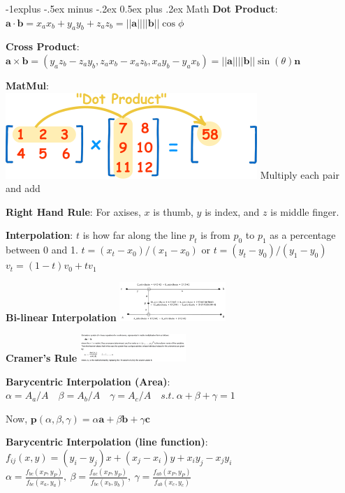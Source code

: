 \documentclass[letterpaper, 8pt]{extarticle}
\makeatletter
\renewcommand{\section}{\@startsection{section}{1}{0mm}%
                                {-1explus -.5ex minus -.2ex}%
                                {0.5ex plus .2ex}%
                                {\normalfont\small\bfseries}}
\makeatother
\begin{document}
\begin{multicols*}{4}

\section{Math}
\textbf{Dot Product}:
\(
\mathbf{a} \cdot \mathbf{b}
= x_a x_b + y_a y_b + z_a z_b
= ||\mathbf{a}|| ||\mathbf{b}|| \cos \phi
\)

\textbf{Cross Product}:
\(
\mathbf{a} \times \mathbf{b}
= (y_a z_b - z_a y_b, z_a x_b - x_a z_b, x_a y_b - y_a x_b)
= ||\mathbf{a}|| ||\mathbf{b}|| \sin(\theta) \mathbf{n}
\)

\textbf{MatMul}:\\
\includegraphics[width=0.3\linewidth]{matrix-multiply-a.png}
Multiply each pair and add

\textbf{Right Hand Rule}:
For axises, $x$ is thumb, $y$ is index, and $z$ is middle finger.

\textbf{Interpolation}:
\(t\) is how far along the line \(p_t\) is from \(p_0\) to \(p_1\) as a percentage between 0 and 1.
\(
t = (x_t - x_0) / (x_1 - x_0)
\text{ or }
t = (y_t - y_0) / (y_1 - y_0)
\)
\(
v_t = (1-t) v_0 + t v_1
\)

\textbf{Bi-linear Interpolation}
\includegraphics[width=4cm]{bilinear-interpolation.png}

\textbf{Cramer's Rule}
\includegraphics[width=4cm]{cramer.png}

\textbf{Barycentric Interpolation (Area)}:
\(
\alpha = A_a / A \quad
\beta = A_b / A \quad
\gamma = A_c / A \quad
s.t.\ \alpha + \beta + \gamma = 1
\)

Now,
\(
\mathbf{p}(\alpha, \beta, \gamma)
= \alpha \mathbf{a} + \beta \mathbf{b} + \gamma \mathbf{c}
\)

\textbf{Barycentric Interpolation (line function)}:
$f_{ij}(x, y) = (y_i - y_j) x + (x_j - x_i)y + x_i y_j - x_j y_i$ \\
$\alpha = \frac{f_{bc}(x_P, y_P)}{f_{bc}(x_a, y_a)},\
\beta = \frac{f_{ac}(x_P, y_P)}{f_{bc}(x_b, y_b)},\
\gamma = \frac{f_{ab}(x_P, y_P)}{f_{ab}(x_c, y_c)}$


\end{multicols*}
\end{document}
